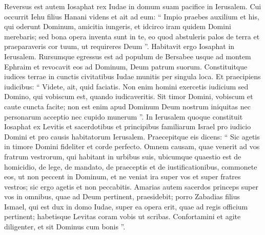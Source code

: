 \begin{biblechapter}
\begin{biblechapter}
\begin{biblechapter}
\begin{biblechapter}
\begin{biblechapter}
\begin{biblechapter}
\begin{biblechapter}
\begin{biblechapter}
\begin{biblechapter}
\begin{biblechapter}
\begin{biblechapter}
\begin{biblechapter}
\begin{biblechapter}
\begin{biblechapter}
\begin{biblechapter}
\begin{biblechapter}
\begin{biblechapter}
\begin{biblechapter}
\begin{biblechapter}
\verse Reversus est autem Iosaphat rex Iudae in domum suam pacifice in Ierusalem. 
\verse Cui occurrit Iehu filius Hanani videns et ait ad eum: “ Impio praebes auxilium et his, qui oderunt Dominum, amicitia iungeris, et idcirco iram quidem Domini merebaris; 
\verse sed bona opera inventa sunt in te, eo quod abstuleris palos de terra et praeparaveris cor tuum, ut requireres Deum ”.
 \verse Habitavit ergo Iosaphat in Ierusalem. Rursumque egressus est ad populum de Bersabee usque ad montem Ephraim et revocavit eos ad Dominum, Deum patrum suorum. 
\verse Constituitque iudices terrae in cunctis civitatibus Iudae munitis per singula loca. 
\verse Et praecipiens iudicibus: “ Videte, ait, quid faciatis. Non enim homini exercetis iudicium sed Domino, qui vobiscum est, quando iudicaveritis. 
\verse Sit timor Domini, vobiscum et caute cuncta facite; non est enim apud Dominum Deum nostrum iniquitas nec personarum acceptio nec cupido munerum ”.
 \verse In Ierusalem quoque constituit Iosaphat ex Levitis et sacerdotibus et principibus familiarum Israel pro iudicio Domini et pro causis habitatorum Ierusalem. 
\verse Praecepitque eis dicens: “ Sic agetis in timore Domini fideliter et corde perfecto. 
\verse Omnem causam, quae venerit ad vos fratrum vestrorum, qui habitant in urbibus suis, ubicumque quaestio est de homicidio, de lege, de mandato, de praeceptis et de iustificationibus, commonete eos, ut non peccent in Dominum, et ne veniat ira super vos et super fratres vestros; sic ergo agetis et non peccabitis. 
\verse Amarias autem sacerdos princeps super vos in omnibus, quae ad Deum pertinent, praesidebit; porro Zabadias filius Ismael, qui est dux in domo Iudae, super ea opera erit, quae ad regis officium pertinent; habetisque Levitas coram vobis ut scribas. Confortamini et agite diligenter, et sit Dominus cum bonis ”.
 

\end{biblechapter}
\end{biblechapter}
\end{biblechapter}
\end{biblechapter}
\end{biblechapter}
\end{biblechapter}
\end{biblechapter}
\end{biblechapter}
\end{biblechapter}
\end{biblechapter}
\end{biblechapter}
\end{biblechapter}
\end{biblechapter}
\end{biblechapter}
\end{biblechapter}
\end{biblechapter}
\end{biblechapter}
\end{biblechapter}
\end{biblechapter}
